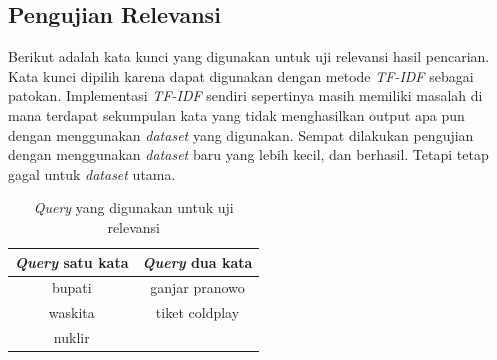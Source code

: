 \subsection{Pengujian Relevansi}

Berikut adalah kata kunci yang digunakan untuk uji relevansi hasil pencarian.
Kata kunci dipilih karena dapat digunakan dengan metode \textit{TF-IDF} sebagai 
patokan. Implementasi \textit{TF-IDF} sendiri sepertinya masih memiliki masalah 
di mana terdapat sekumpulan kata yang tidak menghasilkan output apa pun dengan 
menggunakan \textit{dataset} yang digunakan. Sempat dilakukan pengujian dengan 
menggunakan \textit{dataset} baru yang lebih kecil, dan berhasil. Tetapi tetap 
gagal untuk \textit{dataset} utama.

\begin{center}
\begin{longtable}{|c|c|} 
  \caption{\label{tabel:daftar_query} \textit{Query} yang digunakan untuk uji 
  relevansi}\\
 \hline
  \textit{Query} satu kata & \textit{Query} dua kata \\ 
 \hline
  bupati & ganjar pranowo \\ 
  waskita & tiket coldplay \\
  nuklir &  \\
 \hline
\end{longtable}
\end{center}


